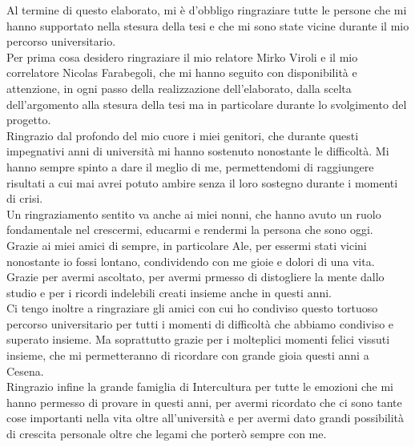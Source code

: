 \documentclass[12pt,a4paper,openright,twoside]{book}
\begin{document}

\backmatter




\begin{acknowledgements}
    Al termine di questo elaborato, mi è d'obbligo ringraziare tutte le persone che mi hanno supportato nella stesura della tesi e che mi sono state vicine 
    durante il mio percorso universitario.\\
    Per prima cosa desidero ringraziare il mio relatore Mirko Viroli e il mio correlatore Nicolas Farabegoli, che mi hanno seguito con disponibilità e attenzione,
    in ogni passo della realizzazione dell'elaborato, dalla scelta dell'argomento alla stesura della tesi ma in particolare durante lo svolgimento del progetto.\\
    Ringrazio dal profondo del mio cuore i miei genitori, che durante questi impegnativi anni di università mi hanno sostenuto nonostante le difficoltà.
    Mi hanno sempre spinto a dare il meglio di me, permettendomi di raggiungere risultati a cui mai avrei potuto ambire senza il loro sostegno durante i momenti di crisi.\\
    Un ringraziamento sentito va anche ai miei nonni, che hanno avuto un ruolo fondamentale nel crescermi, educarmi e rendermi la persona che sono oggi.\\
    Grazie ai miei amici di sempre, in particolare Ale, per essermi stati vicini nonostante io fossi lontano, condividendo con me gioie e dolori di una vita.
    Grazie per avermi ascoltato, per avermi prmesso di distogliere la mente dallo studio e per i ricordi indelebili creati insieme anche in questi anni.\\
    Ci tengo inoltre a ringraziare gli amici con cui ho condiviso questo tortuoso percorso universitario per tutti i momenti di difficoltà che abbiamo condiviso e superato insieme.
    Ma soprattutto grazie per i molteplici momenti felici vissuti insieme, che mi permetteranno di ricordare con grande gioia questi anni a Cesena.\\
    Ringrazio infine la grande famiglia di Intercultura per tutte le emozioni che mi hanno permesso di provare in questi anni, per avermi ricordato che ci sono tante cose 
    importanti nella vita oltre all'università e per avermi dato grandi possibilità di crescita personale oltre che legami che porterò sempre con me.
\end{acknowledgements}
\end{document}
